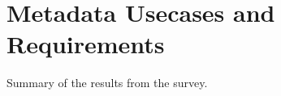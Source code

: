 \section{Metadata Usecases and Requirements}\label{sec:reqs}

Summary of the results from the survey. 
